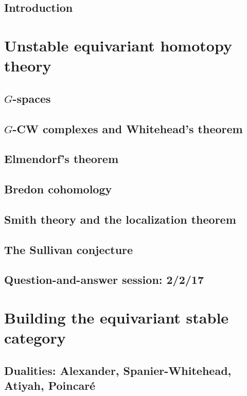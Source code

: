 \documentclass[openany]{style_EHT}
\begin{document}


\frontmatter
\tableofcontents

\section{Introduction}
	

\mainmatter

\chapter{Unstable equivariant homotopy theory}
\section{$G$-spaces}
	
\section{$G$-CW complexes and Whitehead's theorem}
	
\section{Elmendorf's theorem}
	
\section{Bredon cohomology}
	
\section{Smith theory and the localization theorem}
	
\section{The Sullivan conjecture}
	
\section{Question-and-answer session: 2/2/17}
	

\chapter{Building the equivariant stable category}
\section{Dualities: Alexander, Spanier-Whitehead, Atiyah, Poincaré}
	
\end{document}
